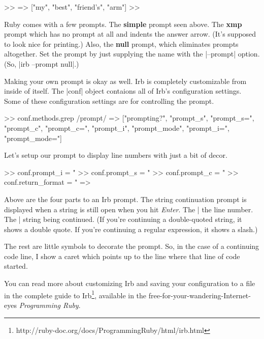 \documentclass[12pt,twoside]{report}
\begin{document}
\begin{consolecode}
 >> %
 => ["my", "best", "friend's", "arm"]
 >>
\end{consolecode}

Ruby comes with a few prompts. The \textbf{simple} prompt seen
above. The \textbf{xmp} prompt which has no prompt at all and indents
the answer arrow. (It's supposed to look nice for printing.) Also, the
\textbf{null} prompt, which eliminates prompts altogether. Set the
prompt by just supplying the name with the
\consoleinline|--prompt| option. (So,
\consoleinline|irb --prompt null|.)

Making your own prompt is okay as well. Irb is completely customizable
from inside of itself. The \consoleinline|conf| object
contaions all of Irb's configuration settings. Some of these
configuration settings are for controlling the prompt.

\begin{consolecode}
 >> conf.methods.grep /prompt/ 
 => ["prompting?", "prompt_s", "prompt_s=", "prompt_c", "prompt_c=",
     "prompt_i", "prompt_mode", "prompt_i=", "prompt_mode="]
\end{consolecode}

Let's setup our prompt to display line numbers with just a bit of
decor.

\begin{consolecode}
 >> conf.prompt_i = "%
 >> conf.prompt_s = "%
 >> conf.prompt_c = "%
 >> conf.return_format = "    => %
\end{consolecode}

Above are the four parts to an Irb prompt. The string continuation
prompt is displayed when a string is still open when you hit
\emph{Enter}. The \consoleinline|%
the line number. The \consoleinline|%
string being continued. (If you're continuing a double-quoted string,
it shows a double quote. If you're continuing a regular expression, it
shows a slash.)

The rest are little symbols to decorate the prompt. So, in the case of
a continuing code line, I show a caret which points up to the line
where that line of code started.

You can read more about customizing Irb and saving your configuration
to a file in the complete guide to
Irb\footnote{http://ruby-doc.org/docs/ProgrammingRuby/html/irb.html},
available in the free-for-your-wandering-Internet-eyes
\emph{Programming Ruby}.
\end{document}

